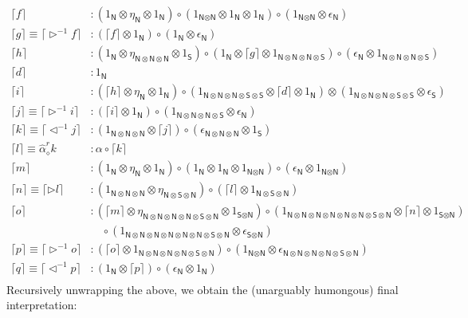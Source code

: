 \documentclass[]{article}
\newcommand{\Xrighta}{\widehat{\alpha}_{\diamond}^{r}}
\newcommand{\ld}{\triangleleft ^{-1}}
\newcommand{\rd}{\triangleright ^{-1}}
\newcommand{\F}[1]{\lceil #1 \rceil}
\newcommand\n{\textsf{N}}
\newcommand\s{\textsf{S}}
\newcommand\ot{\otimes}
\begin{document}
\begin{align*}
\F{f} &: (1_\n \ot \eta_\n \ot 1_\n) \circ (1_{\n \ot \n} \ot 1_\n \ot 1_\n) \circ (1_{\n \ot \n} \ot \epsilon_\n)	\\
\F{g} \equiv \F{\rd f} &: (\F{f} \ot 1_\n) \circ (1_\n \ot \epsilon_\n)\\
\F{h} &: (1_\n \ot \eta_{\n \ot \n \ot \n} \ot 1_\s) \circ (1_\n \ot \F{g} \ot 1_{\n \ot \n \ot \n \ot \s}) \circ (\epsilon_\n \ot 1_{\n \ot \n \ot \n \ot \s})\\
\F{d} &: 1_\n \\
\F{i} &: (\F{h} \ot \eta_\n \ot 1_\n) \circ (1_{\n \ot \n \ot \n \ot \s \ot \s} \ot \F{d} \ot 1_\n) \ot (1_{\n \ot \n \ot \n \ot \s \ot \s} \ot \epsilon_\s)\\
\F{j} \equiv \F{\rd i} &: (\F{i} \ot 1_\n) \circ (1_{\n \ot \n \ot \n \ot \s} \ot \epsilon_\n)\\
\F{k} \equiv \F{\ld j} &: (1_{\n \ot \n \ot \n} \ot \F{j}) \circ (\epsilon_{\n \ot \n \ot \n} \ot 1_\s)\\
\F{l} \equiv \Xrighta{k} &: \alpha \circ \F{k}\\
\F{m} &: (1_\n \ot \eta_\n \ot 1_\n) \circ (1_\n \ot 1_\n \ot 1_{\n \ot \n}) \circ (\epsilon_\n \ot 1_{\n \ot \n})\\
\F{n} \equiv \F{\rhd l} &: (1_{\n \ot \n \ot \n} \ot \eta_{\n \ot \s \ot \n}) \circ (\F{l} \ot 1_{\n \ot \s \ot \n})\\
\F{o} &: (\F{m} \ot \eta_{\n \ot \n \ot \n \ot \n \ot \s \ot \n} \ot 1_{\s \ot \n}) \circ (1_{\n \ot \n \ot \n \ot \n \ot \n \ot \n \ot \s \ot \n} \ot \F{n} \ot 1_{\s \ot \n}) \\
& \quad \circ (1_{\n \ot \n \ot \n \ot \n \ot \n \ot \n \ot \s \ot \n} \ot \epsilon_{\s \ot \n}) \\
\F{p} \equiv \F{\rd o} &: (\F{o} \ot 1_{\n \ot \n \ot \n \ot \n \ot \s \ot \n}) \circ (1_{\n \ot \n} \ot \epsilon_{\n \ot \n \ot \n \ot \n \ot \s \ot \n})\\
\F{q} \equiv \F{\ld p} &: (1_\n \ot \F{p}) \circ (\epsilon_\n \ot 1_\n)\\
\end{align*}
Recursively unwrapping the above, we obtain the (unarguably humongous) final interpretation:
\end{document}
